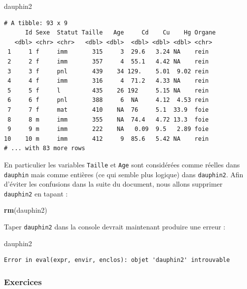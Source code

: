 \documentclass[a4paperpaper,]{article}
\newenvironment{Shaded}{\begin{snugshade}}{\end{snugshade}}
\newcommand{\KeywordTok}[1]{\textcolor[rgb]{0.12,0.11,0.11}{\textbf{#1}}}
\newcommand{\NormalTok}[1]{\textcolor[rgb]{0.12,0.11,0.11}{#1}}
\theoremstyle{definition}
\theoremstyle{definition}
\theoremstyle{definition}
\theoremstyle{remark}
\begin{document}
\begin{Shaded}
\begin{Highlighting}[]
\NormalTok{dauphin2}
\end{Highlighting}
\end{Shaded}

\begin{verbatim}
# A tibble: 93 x 9
      Id Sexe  Statut Taille   Age     Cd    Cu    Hg Organe
   <dbl> <chr> <chr>   <dbl> <dbl>  <dbl> <dbl> <dbl> <chr> 
 1     1 f     imm       315     3  29.6   3.24 NA    rein  
 2     2 f     imm       357     4  55.1   4.42 NA    rein  
 3     3 f     pnl       439    34 129.    5.01  9.02 rein  
 4     4 f     imm       316     4  71.2   4.33 NA    rein  
 5     5 f     l         435    26 192     5.15 NA    rein  
 6     6 f     pnl       388     6  NA     4.12  4.53 rein  
 7     7 f     mat       410    NA  76     5.1  33.9  foie  
 8     8 m     imm       355    NA  74.4   4.72 13.3  foie  
 9     9 m     imm       222    NA   0.09  9.5   2.89 foie  
10    10 m     imm       412     9  85.6   5.42 NA    rein  
# ... with 83 more rows
\end{verbatim}

En particulier les variables \texttt{Taille} et \texttt{Age} sont
considérées comme réelles dans \texttt{dauphin} mais comme entières (ce
qui semble plus logique) dans \texttt{dauphin2}. Afin d'éviter les
confusions dans la suite du document, nous allons supprimer
\texttt{dauphin2} en tapant :

\begin{Shaded}
\begin{Highlighting}[]
\KeywordTok{rm}\NormalTok{(dauphin2)}
\end{Highlighting}
\end{Shaded}

Taper \texttt{dauphin2} dans la console devrait maintenant produire une
erreur :

\begin{Shaded}
\begin{Highlighting}[]
\NormalTok{dauphin2}
\end{Highlighting}
\end{Shaded}

\begin{verbatim}
Error in eval(expr, envir, enclos): objet 'dauphin2' introuvable
\end{verbatim}

\hypertarget{exercices-8}{%
\subsubsection{Exercices}\label{exercices-8}}
\end{document}
